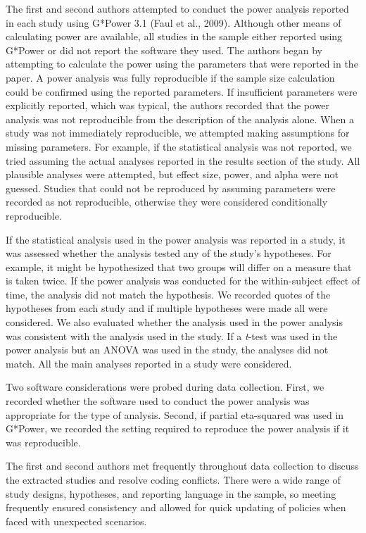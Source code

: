 \documentclass[
  doc, donotrepeattitle,floatsintext]{apa7}
\begin{document}
The first and second authors attempted to conduct the power analysis reported in each study using G*Power 3.1 (Faul et al., 2009). Although other means of calculating power are available, all studies in the sample either reported using G*Power or did not report the software they used. The authors began by attempting to calculate the power using the parameters that were reported in the paper. A power analysis was fully reproducible if the sample size calculation could be confirmed using the reported parameters. If insufficient parameters were explicitly reported, which was typical, the authors recorded that the power analysis was not reproducible from the description of the analysis alone. When a study was not immediately reproducible, we attempted making assumptions for missing parameters. For example, if the statistical analysis was not reported, we tried assuming the actual analyses reported in the results section of the study. All plausible analyses were attempted, but effect size, power, and alpha were not guessed. Studies that could not be reproduced by assuming parameters were recorded as not reproducible, otherwise they were considered conditionally reproducible.

If the statistical analysis used in the power analysis was reported in a study, it was assessed whether the analysis tested any of the study's hypotheses. For example, it might be hypothesized that two groups will differ on a measure that is taken twice. If the power analysis was conducted for the within-subject effect of time, the analysis did not match the hypothesis. We recorded quotes of the hypotheses from each study and if multiple hypotheses were made all were considered. We also evaluated whether the analysis used in the power analysis was consistent with the analysis used in the study. If a \emph{t}-test was used in the power analysis but an ANOVA was used in the study, the analyses did not match. All the main analyses reported in a study were considered.

Two software considerations were probed during data collection. First, we recorded whether the software used to conduct the power analysis was appropriate for the type of analysis. Second, if partial eta-squared was used in G*Power, we recorded the setting required to reproduce the power analysis if it was reproducible.

The first and second authors met frequently throughout data collection to discuss the extracted studies and resolve coding conflicts. There were a wide range of study designs, hypotheses, and reporting language in the sample, so meeting frequently ensured consistency and allowed for quick updating of policies when faced with unexpected scenarios.
\end{document}
